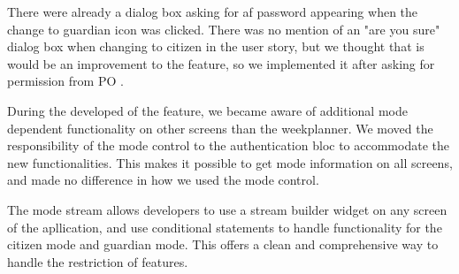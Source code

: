 There were already a dialog box asking for af password appearing when the change to guardian icon was clicked. There was no mention of an "are you sure" dialog box when changing to citizen in the user story, but we thought that is would be an improvement to the feature, so we implemented it after asking for permission from \gls{PO} .

During the developed of the feature, we became aware of additional mode dependent functionality on other screens than the weekplanner.  We moved the responsibility of the mode control to the authentication \gls{bloc} to accommodate the new functionalities. This makes it possible to get mode information on all screens, and made no difference in how we used the mode control.

The mode stream allows developers to use a stream builder widget on any screen of the apllication, and use conditional statements to handle functionality for the citizen mode and guardian mode. This offers a clean and comprehensive way to handle the restriction of features.
